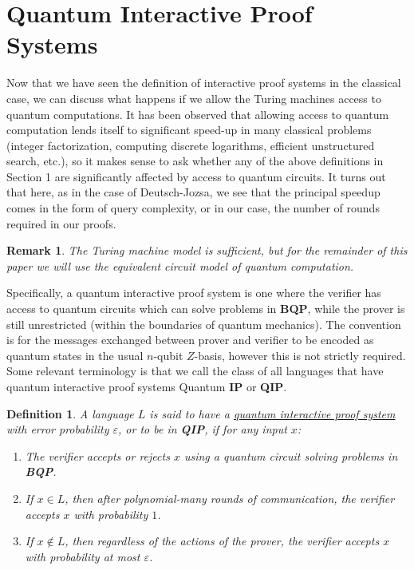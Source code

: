 \documentclass[12pt]{article}
\newtheorem{defn}{Definition}
\newtheorem{rmk}{Remark}
\numberwithin{thm}{section}
\numberwithin{defn}{section}
\numberwithin{prop}{section}
\numberwithin{rmk}{section}
\begin{document}
    \section{Quantum Interactive Proof Systems}
    Now that we have seen the definition of interactive proof systems in the classical case, we can discuss what happens if we allow the Turing machines access to quantum computations. It has been observed that allowing access to quantum computation lends itself to significant speed-up in many classical problems (integer factorization, computing discrete logarithms, efficient unstructured search, etc.), so it makes sense to ask whether any of the above definitions in Section 1 are significantly affected by access to quantum circuits. It turns out that here, as in the case of Deutsch-Jozsa, we see that the principal speedup comes in the form of query complexity, or in our case, the number of rounds required in our proofs.
   
    \begin{rmk}The Turing machine model is sufficient, but for the remainder of this paper we will use the equivalent circuit model of quantum computation. \end{rmk}
    
    Specifically, a quantum interactive proof system is one where the verifier has access to quantum circuits which can solve problems in \textbf{BQP}, while the prover is still unrestricted (within the boundaries of quantum mechanics). The convention is for the messages exchanged between prover and verifier to be encoded as quantum states in the usual $n$-qubit $Z$-basis, however this is not strictly required. Some relevant terminology is that we call the class of all languages that have quantum interactive proof systems Quantum \textbf{IP} or \textbf{QIP}.
    \begin{defn}
    	A language $L$ is said to have a \underline{quantum interactive proof system} with error probability $\varepsilon$, or to be in \textbf{QIP}, if for any input $x$:
    	\begin{enumerate}[label=(\roman*)]
    		\item The verifier accepts or rejects $x$ using a quantum circuit solving problems in \textbf{BQP}.
    		\item If $x\in L$, then after polynomial-many rounds of communication, the verifier accepts $x$ with probability $1$.
    		\item If $x\notin L$, then regardless of the actions of the prover, the verifier accepts $x$ with probability  at most $\varepsilon$.
    	\end{enumerate}
    \end{defn}
\end{document}
